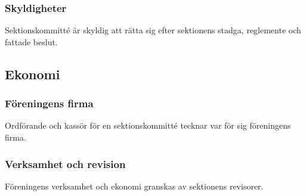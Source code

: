 \subsubsection{Skyldigheter}
Sektionskommitté är skyldig att rätta sig efter sektionens stadga, reglemente och fattade beslut.

\subsection{Ekonomi}

\subsubsection{Föreningens firma}
Ordförande och kassör för en sektionskommitté tecknar var för sig
föreningens firma.

\subsubsection{Verksamhet och revision}
Föreningens verksamhet och ekonomi granskas av sektionens revisorer.
